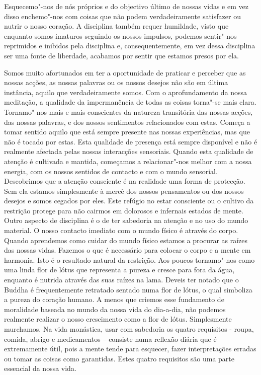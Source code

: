 Esquecemo"-nos de nós próprios e do objectivo último de nossas vidas e em
vez disso enchemo"-nos com coisas que não podem verdadeiramente
satisfazer ou nutrir o nosso coração. A disciplina também requer
humildade, visto que enquanto somos imaturos seguindo os nossos
impulsos, podemos sentir"-nos reprimidos e inibidos pela disciplina e,
consequentemente, em vez dessa disciplina ser uma fonte de liberdade,
acabamos por sentir que estamos presos por ela.

Somos muito afortunados em ter a oportunidade de praticar e perceber que
as nossas acções, as nossas palavras ou os nossos desejos não são em
última instância, aquilo que verdadeiramente somos. Com o aprofundamento
da nossa meditação, a qualidade da impermanência de todas as coisas
torna"-se mais clara. Tornamo"-nos mais e mais conscientes da natureza
transitória das nossas acções, das nossas palavras, e dos nossos
sentimentos relacionados com estas. Começa a tomar sentido aquilo que
está sempre presente nas nossas experiências, mas que não é tocado por
estas. Esta qualidade de presença está sempre disponível e não é
realmente afectada pelas nossas interacções sensoriais. Quando esta
qualidade de atenção é cultivada e mantida, começamos a relacionar"-nos
melhor com a nossa energia, com os nossos sentidos de contacto e com o
mundo sensorial. Descobrimos que a atenção consciente é na realidade uma
forma de protecção. Sem ela estamos simplesmente à mercê dos nossos
pensamentos ou dos nossos desejos e somos cegados por eles. Este refúgio
no estar consciente ou o cultivo da restrição protege para não cairmos em
dolorosos e infernais estados de mente. Outro aspecto de disciplina é o
de ter sabedoria na atenção e no uso do mundo material. O nosso contacto
imediato com o mundo físico é através do corpo. Quando aprendemos como
cuidar do mundo físico estamos a procurar as raízes das nossas vidas.
Fazemos o que é necessário para colocar o corpo e a mente em harmonia.
Isto é o resultado natural da restrição. Aos poucos tornamo"-nos como uma
linda flor de lótus que representa a pureza e cresce para fora da água,
enquanto é nutrida através das suas raízes na lama. Deveis ter notado
que o Buddha é frequentemente retratado sentado numa flor de lótus, o
qual simboliza a pureza do coração humano. A menos que criemos esse
fundamento de moralidade baseada no mundo da nossa vida do dia-a-dia,
não podemos realmente realizar o nosso crescimento como a flor de lótus.
Simplesmente murchamos. Na vida monástica, usar com sabedoria os quatro
requisitos - roupa, comida, abrigo e medicamentos -- consiste numa
reflexão diária que é extremamente útil, pois a mente tende para
esquecer, fazer interpretações erradas ou tomar as coisas como
garantidas. Estes quatro requisitos são uma parte essencial da nossa
vida.

